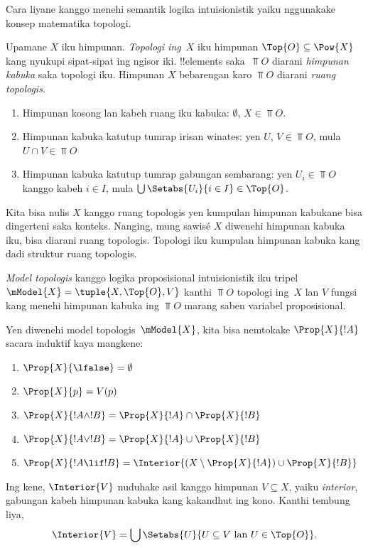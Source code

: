 \documentclass[../../../include/open-logic-section]{subfiles}
\begin{document}


Cara liyane kanggo menehi semantik logika intuisionistik yaiku
nggunakake konsep matematika topologi.

\begin{defn}
  Upamane $X$ iku himpunan. \emph{Topologi ing~$X$} iku himpunan
  $\Top{O} \subseteq \Pow{X}$ kang nyukupi sipat-sipat ing ngisor iki.
  !!{element}s saka~$\Top{O}$ diarani \emph{himpunan kabuka} saka
  topologi iku. Himpunan $X$ bebarengan karo $\Top{O}$ diarani
  \emph{ruang topologis}.
  \begin{enumerate}
  \item Himpunan kosong lan kabeh ruang iku kabuka: $\emptyset$, $X \in
    \Top{O}$.
  \item Himpunan kabuka katutup tumrap irisan winates: yen $U$, $V \in
    \Top{O}$, mula $U \cap V \in \Top{O}$
  \item Himpunan kabuka katutup tumrap gabungan sembarang: yen $U_i \in
    \Top{O}$ kanggo kabeh $i \in I$, mula $\bigcup \Setabs{U_i}{i \in
      I} \in \Top{O}$.
  \end{enumerate}
\end{defn}

Kita bisa nulis $X$ kanggo ruang topologis yen kumpulan himpunan kabukane
bisa dingerteni saka konteks. Nanging, mung sawisé $X$ diwenehi
himpunan kabuka iku, bisa diarani ruang topologis.
Topologi iku kumpulan himpunan kabuka kang dadi struktur ruang topologis.

\begin{defn}
  \emph{Model topologis} kanggo logika proposisional intuisionistik
  iku tripel $\mModel{X} = \tuple{X, \Top{O}, V}$ kanthi $\Top{O}$
  topologi ing~$X$ lan $V$ fungsi kang menehi himpunan kabuka ing
  $\Top{O}$ marang saben variabel proposisional.

  Yen diwenehi model topologis~$\mModel{X}$, kita bisa nemtokake
  $\Prop{X}{!A}$ sacara induktif kaya mangkene:
  \begin{enumerate}
  \item $\Prop{X}{\lfalse} = \emptyset$
  \item $\Prop{X}{p} = V(p)$
  \item $\Prop{X}{!A \land !B} = \Prop{X}{!A} \cap \Prop{X}{!B}$
  \item $\Prop{X}{!A \lor !B} = \Prop{X}{!A} \cup \Prop{X}{!B}$
  \item $\Prop{X}{!A \lif !B} = \Interior{(X \setminus \Prop{X}{!A}) \cup
    \Prop{X}{!B}}$
  \end{enumerate}
  Ing kene, $\Interior{V}$ nuduhake asil kanggo himpunan
  $V \subseteq X$, yaiku \emph{interior}, gabungan kabeh himpunan kabuka kang
  kakandhut ing kono. Kanthi tembung liya,
  \[
  \Interior{V} = \bigcup \Setabs{U}{U \subseteq V \text{ lan } U \in \Top{O}}.
  \]
\end{defn}
\end{document}

